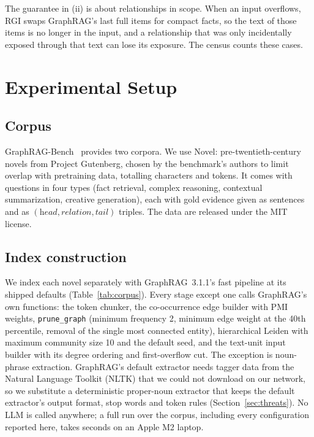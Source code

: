 \documentclass[journal]{IEEEtran}
\theoremstyle{remark}
\begin{document}
The guarantee in (ii) is about relationships in scope. When an input overflows, RGI swaps GraphRAG's last full items for compact facts, so the text of those items is no longer in the input, and a relationship that was only incidentally exposed through that text can lose its exposure. The census counts these cases.

\section{Experimental Setup}\label{sec:setup}

\subsection{Corpus}
GraphRAG-Bench~\cite{xiang2026graphragbench} provides two corpora. We use Novel: \NNovels{} pre-twentieth-century novels from Project Gutenberg, chosen by the benchmark's authors to limit overlap with pretraining data, totalling \NChars{} characters and \NTokens{} tokens. It comes with \NQuestions{} questions in four types (fact retrieval, complex reasoning, contextual summarization, creative generation), each with gold evidence given as sentences and as $(\textit{head},\textit{relation},\textit{tail})$ triples. The data are released under the MIT license.

\subsection{Index construction}
We index each novel separately with GraphRAG~3.1.1's fast pipeline at its shipped defaults (Table~\ref{tab:corpus}). Every stage except one calls GraphRAG's own functions: the token chunker, the co-occurrence edge builder with PMI weights, \texttt{prune\_graph} (minimum frequency 2, minimum edge weight at the 40th percentile, removal of the single most connected entity), hierarchical Leiden with maximum community size 10 and the default seed, and the text-unit input builder with its degree ordering and first-overflow cut. The exception is noun-phrase extraction. GraphRAG's default extractor needs tagger data from the Natural Language Toolkit (NLTK) that we could not download on our network, so we substitute a deterministic proper-noun extractor that keeps the default extractor's output format, stop words and token rules (Section~\ref{sec:threats}). No LLM is called anywhere; a full run over the corpus, including every configuration reported here, takes \RuntimeS{} seconds on an Apple M2 laptop.
\end{document}
